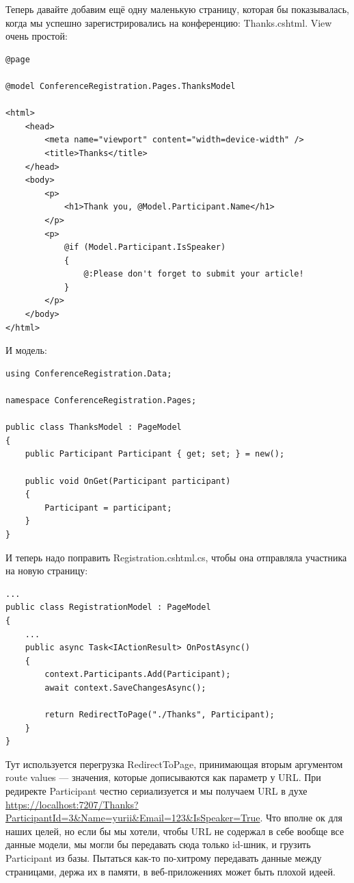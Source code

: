 \documentclass{../../text-style}
\begin{document}
Теперь давайте добавим ещё одну маленькую страницу, которая бы показывалась, когда мы успешно зарегистрировались на конференцию: Thanks.cshtml. View очень простой:

\begin{verbatim}
@page

@model ConferenceRegistration.Pages.ThanksModel

<html>
    <head>
        <meta name="viewport" content="width=device-width" />
        <title>Thanks</title>
    </head>
    <body>
        <p>
            <h1>Thank you, @Model.Participant.Name</h1>
        </p>
        <p>
            @if (Model.Participant.IsSpeaker)
            {
                @:Please don't forget to submit your article!
            }
        </p>
    </body>
</html>
\end{verbatim}

И модель: 

\begin{verbatim}
using ConferenceRegistration.Data;

namespace ConferenceRegistration.Pages;

public class ThanksModel : PageModel
{
    public Participant Participant { get; set; } = new();

    public void OnGet(Participant participant)
    {
        Participant = participant;
    }
}
\end{verbatim}

И теперь надо поправить Registration.cshtml.cs, чтобы она отправляла участника на новую страницу:

\begin{verbatim}
...
public class RegistrationModel : PageModel
{
    ...
    public async Task<IActionResult> OnPostAsync()
    {
        context.Participants.Add(Participant);
        await context.SaveChangesAsync();

        return RedirectToPage("./Thanks", Participant);
    }
}
\end{verbatim}

Тут используется перегрузка RedirectToPage, принимающая вторым аргументом route values --- значения, которые дописываются как параметр у URL. При редиректе Participant честно сериализуется и мы получаем URL в духе \url{https://localhost:7207/Thanks?ParticipantId=3&Name=yurii&Email=123&IsSpeaker=True}. Что вполне ок для наших целей, но если бы мы хотели, чтобы URL не содержал в себе вообще все данные модели, мы могли бы передавать сюда только id-шник, и грузить Participant из базы. Пытаться как-то по-хитрому передавать данные между страницами, держа их в памяти, в веб-приложениях может быть плохой идеей.
\end{document}
